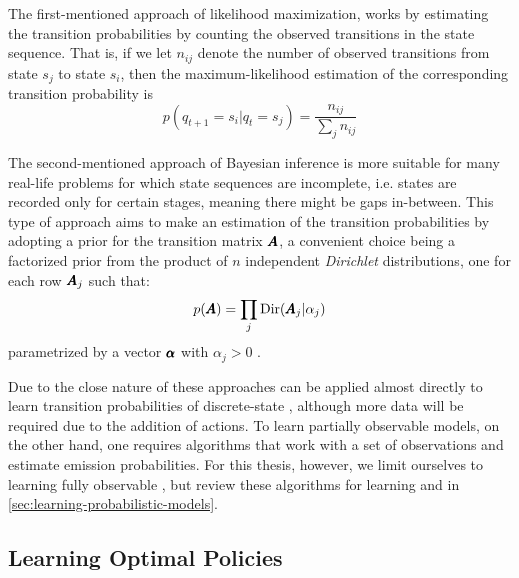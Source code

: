 The first-mentioned approach of likelihood maximization, works by estimating the transition probabilities by counting the observed transitions in the state sequence.
That is, if we let $n_{ij}$ denote the number of observed transitions from state $s_j$ to state $s_i$, then the maximum-likelihood estimation of the corresponding transition probability is
\begin{equation}
p(q_{t+1} = s_i\vert q_t = s_j) = \frac{n_{ij}}{\sum_j n_{ij}}
\end{equation}

The second-mentioned approach of Bayesian inference is more suitable for many real-life problems for which state sequences are incomplete, i.e. states are recorded only for certain stages, meaning there might be gaps in-between.
This type of approach aims to make an estimation of the transition probabilities by adopting a prior for the transition matrix $\pmb{A}$, a convenient choice being a factorized prior from the product of $n$ independent \textit{Dirichlet} distributions, one for each row $\pmb{A}_j$ such that:
\begin{equation}
p(\pmb{A}) = \prod_{j} \text{Dir}(\pmb{A}_j \vert \alpha_j)
\end{equation}
parametrized by a vector $\pmb{\alpha}$ with $\alpha_j > 0$ \cite{pasanisi2012estimating,barberBRML2012}.

Due to the close nature of  these approaches can be applied almost directly to learn transition probabilities of discrete-state , although more data will be required due to the addition of actions.
To learn partially observable models, on the other hand, one requires algorithms that work with a set of observations and estimate emission probabilities.
For this thesis, however, we limit ourselves to learning fully observable , but review these algorithms for learning  and  in \autoref{sec:learning-probabilistic-models}.

\subsection{Learning Optimal Policies}
\label{sec:planning}

